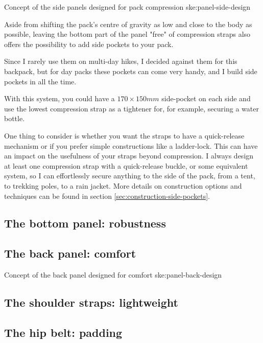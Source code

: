 {Concept of the side panels designed for pack compression}
{ske:panel-side-design}

Aside from shifting the pack's centre of gravity as low and close to the body as possible, leaving the bottom part of the panel "free" of compression straps also offers the possibility to add side pockets to your pack.

Since I rarely use them on multi-day hikes, I decided against them for this backpack, but for day packs these pockets can come very handy, and I build side pockets in all the time.

\begin{note}
   With this system, you could have a $170 \times 150mm$ side-pocket on each side and use the lowest compression strap as a tightener for, for example, securing a water bottle.
\end{note}

One thing to consider is whether you want the straps to have a quick-release mechanism or if you prefer simple constructions like a ladder-lock. This can have an impact on the usefulness of your straps beyond compression. I always design at least one compression strap with a quick-release buckle, or some equivalent system, so I can effortlessly secure anything to the side of the pack, from a tent, to trekking poles, to a rain jacket. More details on construction options and techniques can be found in section \ref{sec:construction-side-pockets}.

\subsection{The bottom panel: robustness}
\subsection{The back panel: comfort}

{Concept of the back panel designed for comfort}
{ske:panel-back-design}

\subsection{The shoulder straps: lightweight}
\subsection{The hip belt: padding}

